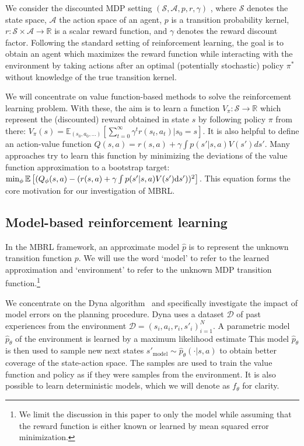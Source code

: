 We consider the discounted MDP setting $(\mathcal{S}, \mathcal{A}, p, r, \gamma)$ \parencite{Puterman1994MarkovDP}, where $\mathcal{S}$ denotes the state space, $\mathcal{A}$ the action space of an agent, $p$ is a transition probability kernel, $r: \mathcal{S} \times \mathcal{A} \rightarrow \mathbb{R}$ is a scalar reward function, and $\gamma$ denotes the reward discount factor. 
Following the standard setting of reinforcement learning, the goal is to obtain an agent which maximizes the reward function while interacting with the environment by taking actions after an optimal (potentially stochastic) policy $\pi^*$ without knowledge of the true transition kernel.

We will concentrate on value function-based methods to solve the reinforcement learning problem. With these, the aim is to learn a function $V_\pi: \mathcal{S} \rightarrow \mathbb{R}$ which represent the (discounted) reward obtained in state $s$ by following policy $\pi$ from there:  $V_\pi(s) = \mathbb{E}_{(s_0, a_0, \dots)}\left[\sum_{t=0}^\infty \gamma^t r(s_t, a_t) | s_0 = s\right]$. 
It is also helpful to define an action-value function $Q(s,a) = r(s,a) + \gamma \int p(s'|s,a) V(s') ds'$. 
Many approaches \parencite{qlearning,dqn,ddqn,sac} try to learn this function by minimizing the deviations of the value function approximation to a bootstrap target: $\min_\phi \mathbb{E}\left[(Q_\phi(s,a) - (r(s,a) + \gamma \int p(s'|s,a) V(s') \mathrm{d}s'))^2\right]$.
This equation forms the core motivation for our investigation of MBRL.

\subsection{Model-based reinforcement learning}

In the MBRL framework, an approximate model $\hat{p}$ is  to represent the unknown transition function $p$. 
We will use the word `model' to refer to the learned approximation and `environment' to refer to the unknown MDP transition function.\footnote{We limit the discussion in this paper to only the model while assuming that the reward function is either known or learned by mean squared error minimization. }


We concentrate on the Dyna algorithm~\parencite{dyna} and specifically investigate the impact of model errors on the planning procedure. 
Dyna uses a dataset $\mathcal{D}$ of past experiences from the environment $\mathcal{D}=(s_i,a_i,r_i,s'_i)_{i=1}^N$. A parametric model $\hat{p}_\theta$ of the environment is learned by a maximum likelihood estimate  This model $\hat{p}_\theta$ is then used to sample new next states $s'_\text{model} \sim \hat{p}_\theta(\cdot|s,a)$ to obtain better coverage of the state-action space.
The samples are used to train the value function and policy as if they were samples from the environment.
It is also possible to learn deterministic models, which we will denote as $f_\theta$ for clarity.

